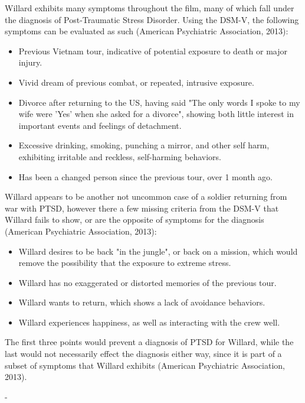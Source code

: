 \documentclass[a4paper,man,natbib]{apa6}
\begin{document}
Willard exhibits many symptoms throughout the film, many of which fall under the diagnosis of Post-Traumatic Stress Disorder. Using the DSM-V, the following symptoms can be evaluated as such (American Psychiatric Association, 2013):
\begin{itemize}
\item Previous Vietnam tour, indicative of potential exposure to death or major injury.
\item Vivid dream of previous combat, or repeated, intrusive exposure.
\item Divorce after returning to the US, having said "The only words I spoke to my wife were 'Yes' when she asked for a divorce", showing both little interest in important events and feelings of detachment.
\item Excessive drinking, smoking, punching a mirror, and other self harm, exhibiting irritable and reckless, self-harming behaviors.
\item Has been a changed person since the previous tour, over 1 month ago.
\end{itemize} 
Willard appears to be another not uncommon case of a soldier returning from war with PTSD, however there a few missing criteria from the DSM-V that Willard fails to show, or are the opposite of symptoms for the diagnosis (American Psychiatric Association, 2013):
\begin{itemize}
\item Willard desires to be back "in the jungle", or back on a mission, which would remove the possibility that the exposure to extreme stress.
\item Willard has no exaggerated or distorted memories of the previous tour.
\item Willard wants to return, which shows a lack of avoidance behaviors.
\item Willard experiences happiness, as well as interacting with the crew well.
\end{itemize}
The first three points would prevent a diagnosis of PTSD for Willard, while the last would not necessarily effect the diagnosis either way, since it is part of a subset of symptoms that Willard exhibits (American Psychiatric Association, 2013).

-
\end{document}
